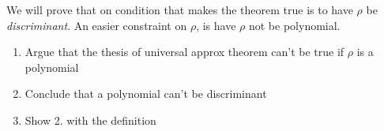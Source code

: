 We will prove that on condition that makes the theorem true is to have \(\rho\)
be \emph{discriminant}. An easier constraint on \(\rho\), is have \(\rho\) not
be polynomial.

\begin{eser}{}
\begin{enumerate}[label = \arabic*.]
    \item Argue that the thesis of universal approx theorem can't be true if \(\rho\) is a
        polynomial
    \item Conclude that a polynomial can't be discriminant
    \item Show 2. with the definition
\end{enumerate}
\end{eser}

